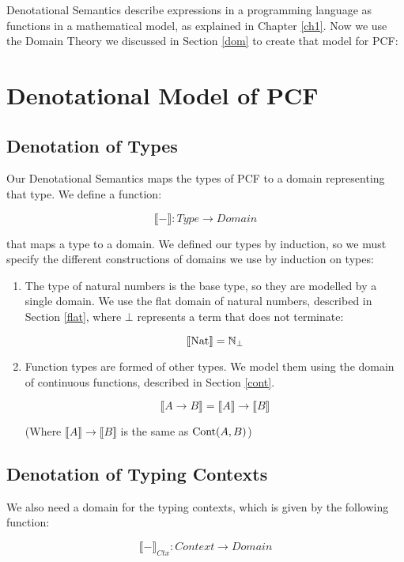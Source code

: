 Denotational Semantics describe expressions in a programming language as functions in a mathematical model, as explained in Chapter \ref{ch1}. Now we use the Domain Theory we discussed in Section \ref{dom} to create that model for PCF:

\section{Denotational Model of PCF} 

\subsection{Denotation of Types}

Our Denotational Semantics maps the types of PCF to a domain representing that type. We define a function:

\[\llbracket - \rrbracket : Type \to Domain \]

that maps a type to a domain. We defined our types by induction, so we must specify the different constructions of domains we use by induction on types:

\begin{enumerate}
\item{The type of natural numbers is the base type, so they are modelled by a single domain. We use the flat domain of natural numbers, described in Section \ref{flat}, where $\bot$ represents a term that does not terminate:

\[ \llbracket \operatorname{Nat} \rrbracket = \mathbb{N}_{\bot} \]

}
\item{Function types are formed of other types. We model them using the domain of continuous functions, described in Section \ref{cont}.

\[\llbracket A \to B \rrbracket = \llbracket A \rrbracket \to \llbracket B \rrbracket \]

(Where $\llbracket A \rrbracket \to \llbracket B \rrbracket$ is the same as $\operatorname{Cont}(A,B)$)}
\end{enumerate}

\subsection{Denotation of Typing Contexts}
We also need a domain for the typing contexts, which is given by the following function:

\[ \llbracket - \rrbracket_{Ctx} : Context \to Domain \]

